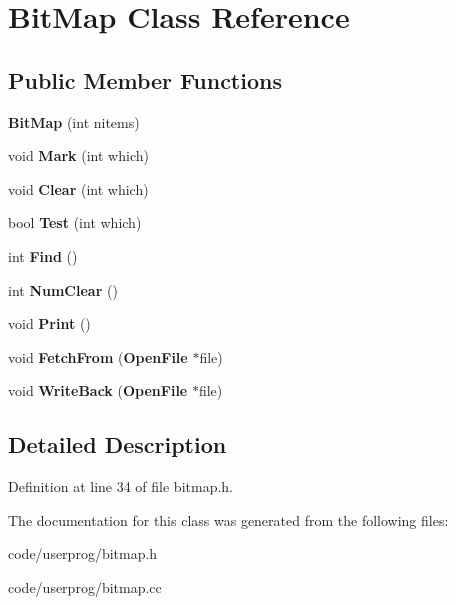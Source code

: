 \section{Bit\+Map Class Reference}
\label{class_bit_map}
\subsection*{Public Member Functions}
\begin{DoxyCompactItemize}
\item 
{\bfseries Bit\+Map} (int nitems)\label{class_bit_map_a957cdc72d04ce006b2efce59caa90379}

\item 
void {\bfseries Mark} (int which)\label{class_bit_map_ae3eb006c755440ae830bf220457dbbc7}

\item 
void {\bfseries Clear} (int which)\label{class_bit_map_aee4445b4d2079c96f5c87896717569d2}

\item 
bool {\bfseries Test} (int which)\label{class_bit_map_af5a945ba7b79e92a5a1bb0db24ecf26a}

\item 
int {\bfseries Find} ()\label{class_bit_map_a031ad924663dcae2359403b3a76a9dd8}

\item 
int {\bfseries Num\+Clear} ()\label{class_bit_map_af73514736aff03229d58557d0423daca}

\item 
void {\bfseries Print} ()\label{class_bit_map_a04d9c800f2a3b815f47d22c149ceae01}

\item 
void {\bfseries Fetch\+From} ({\bf Open\+File} $\ast$file)\label{class_bit_map_ad6d12eefec9b64e903d072c83f7c29a2}

\item 
void {\bfseries Write\+Back} ({\bf Open\+File} $\ast$file)\label{class_bit_map_a19052d41ba5a654c7e478582dffba20d}

\end{DoxyCompactItemize}


\subsection{Detailed Description}


Definition at line 34 of file bitmap.\+h.



The documentation for this class was generated from the following files\+:\begin{DoxyCompactItemize}
\item 
code/userprog/bitmap.\+h\item 
code/userprog/bitmap.\+cc\end{DoxyCompactItemize}
